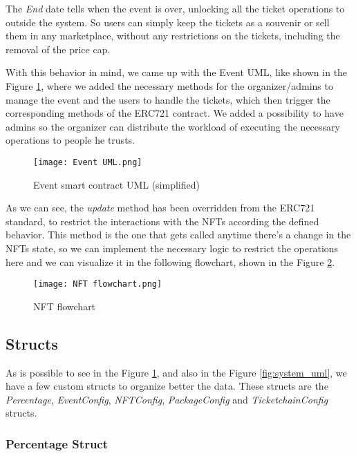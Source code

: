 The \textit{End} date tells when the event is over, unlocking all the ticket
operations to outside the system. So users can simply keep the tickets as a
souvenir or sell them in any marketplace, without any restrictions on the
tickets, including the removal of the price cap.

With this behavior in mind, we came up with the Event UML, like shown in the
Figure \ref{fig:event_uml}, where we added the necessary methods for the
organizer/admins to manage the event and the users to handle the tickets, which
then trigger the corresponding methods of the ERC721 contract. We added a
possibility to have admins so the organizer can distribute the workload of
executing the necessary operations to people he trusts.

\begin{figure}[H]
	\texttt{[image: Event UML.png]}
	\centering
	\caption{Event smart contract UML (simplified)}
	\label{fig:event_uml}
\end{figure}

As we can see, the \textit{update} method has been overridden from the ERC721
standard, to restrict the interactions with the NFTs according the defined
behavior. This method is the one that gets called anytime there's a change in
the NFTs state, so we can implement the necessary logic to restrict the
operations here and we can visualize it in the following flowchart, shown in
the Figure \ref{fig:nft_flowchart}.

\begin{figure}[H]
	\texttt{[image: NFT flowchart.png]}
	\centering
	\caption{NFT flowchart}
	\label{fig:nft_flowchart}
\end{figure}

\subsection{Structs}
\label{subsec:structs}

As is possible to see in the Figure \ref{fig:event_uml}, and also in the Figure
\ref{fig:system_uml}, we have a few custom structs to organize better the data.
These structs are the \textit{Percentage}, \textit{EventConfig},
\textit{NFTConfig}, \textit{PackageConfig} and \textit{TicketchainConfig}
structs.

\subsubsection{Percentage Struct}
\label{subsubsec:percentage_struct}

